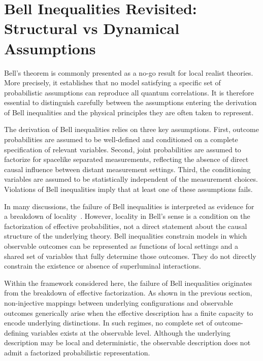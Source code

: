 \section{Bell Inequalities Revisited: Structural vs Dynamical Assumptions}
  \label{sec:abstract-math-model}

  Bell’s theorem is commonly presented as a no-go result for local realist theories.
  More precisely, it establishes that no model satisfying a specific set of probabilistic
  assumptions can reproduce all quantum correlations.
  It is therefore essential to distinguish carefully between the assumptions entering
  the derivation of Bell inequalities and the physical principles they are often taken to represent.

  The derivation of Bell inequalities relies on three key assumptions.
  First, outcome probabilities are assumed to be well-defined and conditioned on a
  complete specification of relevant variables.
  Second, joint probabilities are assumed to factorize for spacelike separated
  measurements, reflecting the absence of direct causal influence between distant measurement settings.
  Third, the conditioning variables are assumed to be statistically independent of the measurement choices.
  Violations of Bell inequalities imply that at least one of these assumptions fails.

  In many discussions, the failure of Bell inequalities is interpreted as evidence for a breakdown of
  locality~\cite{Bell1964}.
  However, locality in Bell’s sense is a condition on the factorization of effective
  probabilities, not a direct statement about the causal structure of the underlying
  theory.
  Bell inequalities constrain models in which observable outcomes can be represented
  as functions of local settings and a shared set of variables that fully determine
  those outcomes.
  They do not directly constrain the existence or absence of superluminal interactions.

  Within the framework considered here, the failure of Bell inequalities originates
  from the breakdown of effective factorization.
  As shown in the previous section, non-injective mappings between underlying
  configurations and observable outcomes generically arise when the effective
  description has a finite capacity to encode underlying distinctions.
  In such regimes, no complete set of outcome-defining variables exists at the
  observable level.
  Although the underlying description may be local and deterministic, the observable
  description does not admit a factorized probabilistic representation.

